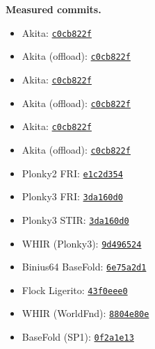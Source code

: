 \medskip
\noindent\textbf{Measured commits.}
\begin{itemize}\setlength{\itemsep}{0pt}
\item Akita: \href{https://github.com/LayerZero-Labs/akita/commit/c0cb822f28b7b9efe85b1924b029d36e13cdf516}{\texttt{c0cb822f}}
\item Akita (offload): \href{https://github.com/LayerZero-Labs/akita/commit/c0cb822f28b7b9efe85b1924b029d36e13cdf516}{\texttt{c0cb822f}}
\item Akita: \href{https://github.com/LayerZero-Labs/akita/commit/c0cb822f28b7b9efe85b1924b029d36e13cdf516}{\texttt{c0cb822f}}
\item Akita (offload): \href{https://github.com/LayerZero-Labs/akita/commit/c0cb822f28b7b9efe85b1924b029d36e13cdf516}{\texttt{c0cb822f}}
\item Akita: \href{https://github.com/LayerZero-Labs/akita/commit/c0cb822f28b7b9efe85b1924b029d36e13cdf516}{\texttt{c0cb822f}}
\item Akita (offload): \href{https://github.com/LayerZero-Labs/akita/commit/c0cb822f28b7b9efe85b1924b029d36e13cdf516}{\texttt{c0cb822f}}
\item Plonky2 FRI: \href{https://github.com/elliottech/plonky2/commit/e1c2d35450948b88fca6a7e69e2643c3ecad3caa}{\texttt{e1c2d354}}
\item Plonky3 FRI: \href{https://github.com/Plonky3/Plonky3/commit/3da160d09d1c6a878adaa5b339939fcdccda5d36}{\texttt{3da160d0}}
\item Plonky3 STIR: \href{https://github.com/Plonky3/Plonky3/commit/3da160d09d1c6a878adaa5b339939fcdccda5d36}{\texttt{3da160d0}}
\item WHIR (Plonky3): \href{https://github.com/Plonky3/Plonky3/commit/9d496524560f3c699473906c6f50fca7cf343730}{\texttt{9d496524}}
\item Binius64 BaseFold: \href{https://github.com/binius-zk/binius64/commit/6e75a2d1d2e716578ae3ccb62806413fb1615176}{\texttt{6e75a2d1}}
\item Flock Ligerito: \href{https://github.com/succinctlabs/flock/commit/43f0eee06d887d87ad25d72614cbc2b17fe91430}{\texttt{43f0eee0}}
\item WHIR (WorldFnd): \href{https://github.com/worldfnd/whir/commit/8804e80e8e890d01bb585f2bd5e5b564ac0fd80d}{\texttt{8804e80e}}
\item BaseFold (SP1): \href{https://github.com/succinctlabs/sp1/commit/0f2a1e1389747ac0dbee1c4d40243eed20baba86}{\texttt{0f2a1e13}}
\end{itemize}



